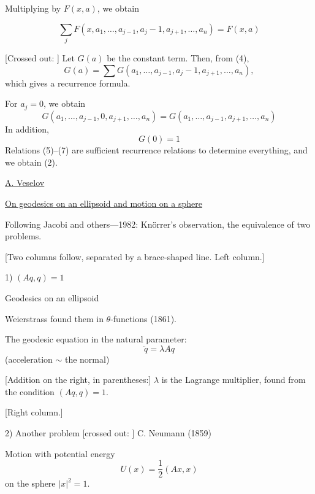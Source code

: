 Multiplying by $F(x,a)$, we obtain


\begin{equation*}
\sum_j F(x,a_1,\ldots,a_{j-1},a_j-1,a_{j+1},\ldots,a_n)=F(x,a)\tag{4}
\end{equation*}

[Crossed out: ]
Let $G(a)$ be the constant term. Then, from (4),
\begin{equation*}
G(a)=\sum G(a_1,\ldots,a_{j-1},a_j-1,a_{j+1},\ldots,a_n),\tag{5}
\end{equation*}
which gives a recurrence formula.

For $a_j=0$, we obtain
\begin{equation*}
G(a_1,\ldots,a_{j-1},0,a_{j+1},\ldots,a_n)
=G(a_1,\ldots,a_{j-1},a_{j+1},\ldots,a_n)\tag{6}
\end{equation*}
In addition,
\begin{equation*}
G(0)=1\tag{7}
\end{equation*}
Relations (5)--(7) are sufficient recurrence relations
to determine everything, and we obtain (2).

\underline{A. Veselov}

\underline{On geodesics on an ellipsoid and motion on a sphere}

Following Jacobi and others---1982: Kn\"orrer's observation, the equivalence of two problems.

[Two columns follow, separated by a brace-shaped line. Left column.]

1) $(Aq,q)=1$

Geodesics on an ellipsoid

Weierstrass found them in $\theta$-functions (1861).

The geodesic equation in the natural parameter:
\begin{equation*}
\ddot q=\lambda Aq\tag{1}
\end{equation*}
(acceleration $\sim$ the normal)

[Addition on the right, in parentheses:]
$\lambda$ is the Lagrange multiplier, found from the condition $(Aq,q)=1$.

[Right column.]

2) Another problem [crossed out: ]
C. Neumann (1859)

Motion with potential energy
\begin{equation*}
U(x)=\frac12(Ax,x)
\end{equation*}
on the sphere $|x|^2=1$.

